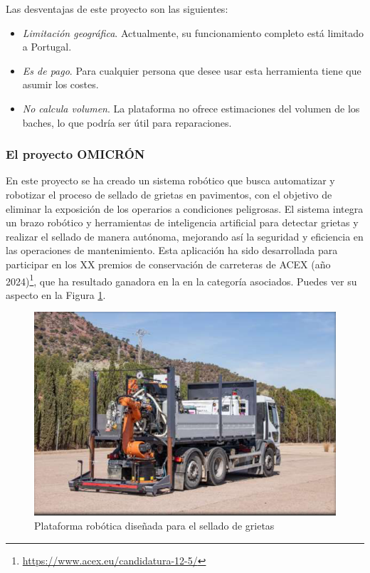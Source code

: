 Las desventajas de este proyecto son las siguientes:
\begin{itemize}
	\item \textit{Limitación geográfica}. Actualmente, su funcionamiento completo está limitado a Portugal.
	\item \textit{Es de pago}. Para cualquier persona que desee usar esta herramienta tiene que asumir los costes.
	\item \textit{No calcula volumen}. La plataforma no ofrece estimaciones del volumen de los baches, lo que podría ser útil para reparaciones.
\end{itemize}


\subsubsection{El proyecto OMICRÓN}
\label{subsubsec:sistema4}

En este proyecto se ha creado un sistema robótico que busca automatizar y robotizar el proceso de sellado de grietas en pavimentos, con el objetivo de eliminar la exposición de los operarios a condiciones peligrosas. El sistema integra un brazo robótico y herramientas de inteligencia artificial para detectar grietas y realizar el sellado de manera autónoma, mejorando así la seguridad y eficiencia en las operaciones de mantenimiento. Esta aplicación ha sido desarrollada para participar en los XX premios de conservación de carreteras de \ac{ACEX} (año 2024)\footnote{\url{https://www.acex.eu/candidatura-12-5/}}, que ha resultado ganadora en la en la categoría asociados. Puedes ver su aspecto en la Figura \ref{fig:omicron}.

\begin{figure} [h!]
	\begin{center}
		\includegraphics[width=15cm]{figs/omicron.png}
	\end{center}
	\caption{Plataforma robótica diseñada para el sellado de grietas}
	\label{fig:omicron}
\end{figure}

